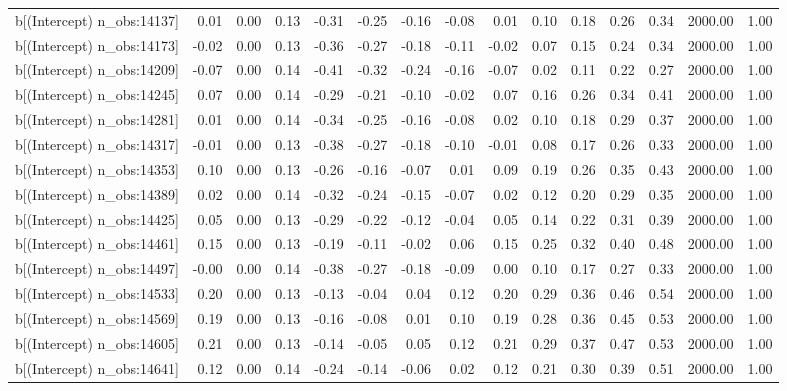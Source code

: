 \begin{table}[ht]
\begin{tabular}{rrrrrrrrrrrrrrr}
  b[(Intercept) n\_obs:14137] & 0.01 & 0.00 & 0.13 & -0.31 & -0.25 & -0.16 & -0.08 & 0.01 & 0.10 & 0.18 & 0.26 & 0.34 & 2000.00 & 1.00 \\ 
  b[(Intercept) n\_obs:14173] & -0.02 & 0.00 & 0.13 & -0.36 & -0.27 & -0.18 & -0.11 & -0.02 & 0.07 & 0.15 & 0.24 & 0.34 & 2000.00 & 1.00 \\ 
  b[(Intercept) n\_obs:14209] & -0.07 & 0.00 & 0.14 & -0.41 & -0.32 & -0.24 & -0.16 & -0.07 & 0.02 & 0.11 & 0.22 & 0.27 & 2000.00 & 1.00 \\ 
  b[(Intercept) n\_obs:14245] & 0.07 & 0.00 & 0.14 & -0.29 & -0.21 & -0.10 & -0.02 & 0.07 & 0.16 & 0.26 & 0.34 & 0.41 & 2000.00 & 1.00 \\ 
  b[(Intercept) n\_obs:14281] & 0.01 & 0.00 & 0.14 & -0.34 & -0.25 & -0.16 & -0.08 & 0.02 & 0.10 & 0.18 & 0.29 & 0.37 & 2000.00 & 1.00 \\ 
  b[(Intercept) n\_obs:14317] & -0.01 & 0.00 & 0.13 & -0.38 & -0.27 & -0.18 & -0.10 & -0.01 & 0.08 & 0.17 & 0.26 & 0.33 & 2000.00 & 1.00 \\ 
  b[(Intercept) n\_obs:14353] & 0.10 & 0.00 & 0.13 & -0.26 & -0.16 & -0.07 & 0.01 & 0.09 & 0.19 & 0.26 & 0.35 & 0.43 & 2000.00 & 1.00 \\ 
  b[(Intercept) n\_obs:14389] & 0.02 & 0.00 & 0.14 & -0.32 & -0.24 & -0.15 & -0.07 & 0.02 & 0.12 & 0.20 & 0.29 & 0.35 & 2000.00 & 1.00 \\ 
  b[(Intercept) n\_obs:14425] & 0.05 & 0.00 & 0.13 & -0.29 & -0.22 & -0.12 & -0.04 & 0.05 & 0.14 & 0.22 & 0.31 & 0.39 & 2000.00 & 1.00 \\ 
  b[(Intercept) n\_obs:14461] & 0.15 & 0.00 & 0.13 & -0.19 & -0.11 & -0.02 & 0.06 & 0.15 & 0.25 & 0.32 & 0.40 & 0.48 & 2000.00 & 1.00 \\ 
  b[(Intercept) n\_obs:14497] & -0.00 & 0.00 & 0.14 & -0.38 & -0.27 & -0.18 & -0.09 & 0.00 & 0.10 & 0.17 & 0.27 & 0.33 & 2000.00 & 1.00 \\ 
  b[(Intercept) n\_obs:14533] & 0.20 & 0.00 & 0.13 & -0.13 & -0.04 & 0.04 & 0.12 & 0.20 & 0.29 & 0.36 & 0.46 & 0.54 & 2000.00 & 1.00 \\ 
  b[(Intercept) n\_obs:14569] & 0.19 & 0.00 & 0.13 & -0.16 & -0.08 & 0.01 & 0.10 & 0.19 & 0.28 & 0.36 & 0.45 & 0.53 & 2000.00 & 1.00 \\ 
  b[(Intercept) n\_obs:14605] & 0.21 & 0.00 & 0.13 & -0.14 & -0.05 & 0.05 & 0.12 & 0.21 & 0.29 & 0.37 & 0.47 & 0.53 & 2000.00 & 1.00 \\ 
  b[(Intercept) n\_obs:14641] & 0.12 & 0.00 & 0.14 & -0.24 & -0.14 & -0.06 & 0.02 & 0.12 & 0.21 & 0.30 & 0.39 & 0.51 & 2000.00 & 1.00 \\ 

\end{tabular}
\end{table}
